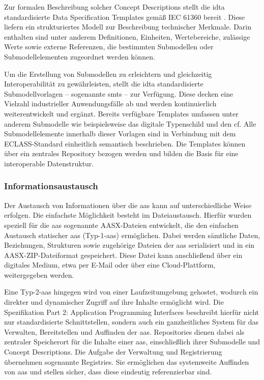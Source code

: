Zur formalen Beschreibung solcher Concept Descriptions stellt die \acs{idta} standardisierte Data Specification Templates gemäß IEC 61360 bereit \cite{SpezifikationPart3a}.
Diese liefern ein strukturiertes Modell zur Beschreibung technischer Merkmale.
Darin enthalten sind unter anderem Definitionen, Einheiten, Wertebereiche, zulässige Werte sowie externe Referenzen, die bestimmten Submodellen oder Submodellelementen zugeordnet werden können.

Um die Erstellung von Submodellen zu erleichtern und gleichzeitig Interoperabilität zu gewährleisten, stellt die \acs{idta} standardisierte Submodellvorlagen -- sogenannte \acp{smt} -- zur Verfügung.
Diese decken eine Vielzahl industrieller Anwendungsfälle ab und werden kontinuierlich weiterentwickelt und ergänzt.
Bereits verfügbare Templates umfassen unter anderem Submodelle wie beispielsweise das digitale \linebreak
Typenschild und den \ac{cf}.
Alle Submodellelemente innerhalb dieser Vorlagen sind in Verbindung mit dem ECLASS-Standard einheitlich semantisch beschrieben.
Die Templates können über ein zentrales Repository \cite{idtaTemplates} bezogen werden und bilden die Basis für eine interoperable Datenstruktur.

\subsubsection{Informationsaustausch}
Der Austausch von Informationen über die \acs{aas} kann auf unterschiedliche Weise erfolgen.
Die einfachste Möglichkeit besteht im Dateiaustausch. Hierfür wurden speziell für die \acs{aas} sogenannte AASX-Dateien \cite{SpezifikationPart5} entwickelt, die den einfachen Austausch statischer \acs{aas} (Typ-1-\acs{aas}) ermöglichen.
Dabei werden sämtliche Daten, Beziehungen, Strukturen sowie zugehörige Dateien der \acs{aas} serialisiert und in ein AASX-ZIP-Dateiformat gespeichert. 
Diese Datei kann anschließend über ein digitales Medium, etwa per E-Mail oder über eine Cloud-Plattform, weitergegeben werden. 

Eine Typ-2-\acs{aas} hingegen wird von einer Laufzeitumgebung gehostet, wodurch ein direkter und dynamischer Zugriff auf ihre Inhalte ermöglicht wird. 
Die Spezifikation Part 2: Application Programming Interfaces \cite{SpezifikationPart2} beschreibt hierfür nicht nur standardisierte Schnittstellen, sondern auch ein ganzheitliches System für das Verwalten, Bereitstellen und Auffinden der \acs{aas}.
Repositories dienen dabei als zentraler Speicherort für die Inhalte einer \acs{aas}, einschließlich ihrer Submodelle und Concept Descriptions.
Die Aufgabe der Verwaltung und Registrierung übernehmen sogenannte Registries.
Sie ermöglichen das systemweite Auffinden von \acs{aas} und stellen sicher, dass diese eindeutig referenzierbar sind.

